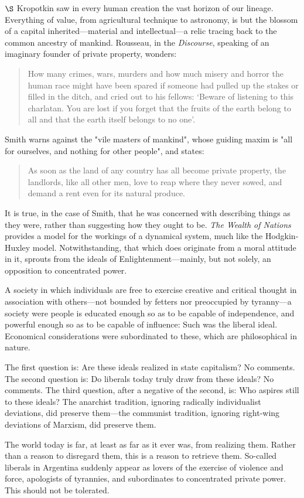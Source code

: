 \documentclass[a4paper]{article}
\begin{document}
$\S$ Kropotkin saw in every human creation the vast horizon of our lineage.
Everything of value, from agricultural technique to astronomy, is but the
blossom of a capital inherited---material and intellectual---a relic tracing
back to the common ancestry of mankind. Rousseau, in the \textit{Discourse},
speaking of an imaginary founder of private property, wonders:

\begin{quote}
    How many crimes, wars, murders and how much misery and horror the human
    race might have been spared if someone had pulled up the stakes or filled
    in the ditch, and cried out to his fellows: ‘Beware of listening to this
    charlatan. You are lost if you forget that the fruits of the earth belong
    to all and that the earth itself belongs to no one’.
\end{quote}

Smith warns against  the "vile masters of mankind", whose guiding maxim is "all
for ourselves, and nothing for other people", and states:

\begin{quote}
    As soon as the land of any country has all become private property, the
    landlords, like all other men, love to reap where they never sowed, and
    demand a rent even for its natural produce.
\end{quote}

It is true, in the case of Smith, that he was concerned with describing things
as they were, rather than suggesting how they ought to be. \textit{The Wealth
of Nations} provides a model for the workings of a dynamical system, much like
the Hodgkin-Huxley model. Notwithstanding, that which
does originate from a moral attitude in it, sprouts from the ideals of
Enlightenment---mainly, but not solely, an opposition to concentrated power.

A society in which individuals are free to exercise creative and critical
thought in association with others---not bounded by fetters nor preoccupied by
tyranny---a society were people is educated enough so as to be capable of
independence, and powerful enough so as to be capable of influence: Such was
the liberal ideal. Economical considerations were subordinated to these, which
are philosophical in nature.

The first question is: Are these ideals realized in state capitalism? No
comments. The second question is: Do liberals today truly draw from these
ideals? No comments. The third question, after a negative of the second, is:
Who aspires still to these ideals? The anarchist tradition, ignoring radically
individualist deviations, did preserve them---the communist tradition, ignoring
right-wing deviations of Marxism, did preserve them.

The world today is far, at least as far as it ever was, from realizing them.
Rather than a reason to disregard them, this is a reason to retrieve them.
So-called liberals in Argentina suddenly appear as lovers of the exercise of
violence and force, apologists of tyrannies, and subordinates to concentrated
private power. This should not be tolerated. 
\end{document}
